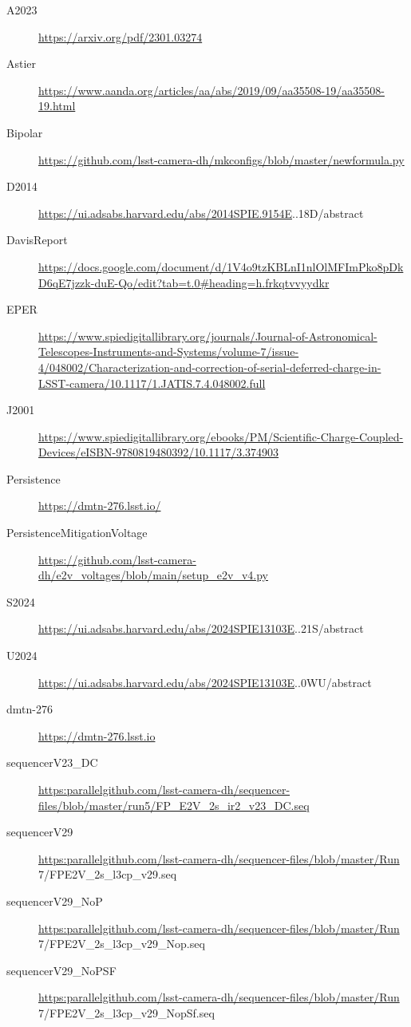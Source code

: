 \label{citations}
\begin{description}
\item[\label{A2023}{A2023}]
\url{https://arxiv.org/pdf/2301.03274}
\item[\label{Astier}{Astier}]
\url{https://www.aanda.org/articles/aa/abs/2019/09/aa35508-19/aa35508-19.html}
\item[\label{Bipolar}{Bipolar}]
\url{https://github.com/lsst-camera-dh/mkconfigs/blob/master/newformula.py}
\item[\label{D2014}{D2014}]
\url{https://ui.adsabs.harvard.edu/abs/2014SPIE.9154E}..18D/abstract
\item[\label{DavisReport}{DavisReport}]
\url{https://docs.google.com/document/d/1V4o9tzKBLnI1nlOlMFImPko8pDkD6qE7jzzk-duE-Qo/edit?tab=t.0\#heading=h.frkqtvvyydkr}
\item[\label{EPER}{EPER}]
\url{https://www.spiedigitallibrary.org/journals/Journal-of-Astronomical-Telescopes-Instruments-and-Systems/volume-7/issue-4/048002/Characterization-and-correction-of-serial-deferred-charge-in-LSST-camera/10.1117/1.JATIS.7.4.048002.full}
\item[\label{J2001}{J2001}]
\url{https://www.spiedigitallibrary.org/ebooks/PM/Scientific-Charge-Coupled-Devices/eISBN-9780819480392/10.1117/3.374903}
\item[\label{Persistence}{Persistence}]
\url{https://dmtn-276.lsst.io/}
\item[\label{PersistenceMitigationVoltage}{PersistenceMitigationVoltage}]
\url{https://github.com/lsst-camera-dh/e2v_voltages/blob/main/setup_e2v_v4.py}
\item[\label{S2024}{S2024}]
\url{https://ui.adsabs.harvard.edu/abs/2024SPIE13103E}..21S/abstract
\item[\label{U2024}{U2024}]
\url{https://ui.adsabs.harvard.edu/abs/2024SPIE13103E}..0WU/abstract
\item[\label{dmtn-276}{dmtn-276}]
\url{https://dmtn-276.lsst.io}
\item[\label{sequencerV23_DC}{sequencerV23\_DC}]
\url{https:parallelgithub.com/lsst-camera-dh/sequencer-files/blob/master/run5/FP_E2V_2s_ir2_v23_DC.seq}
\item[\label{sequencerV29}{sequencerV29}]
\url{https:parallelgithub.com/lsst-camera-dh/sequencer-files/blob/master/Run}
7/FP\label{e2v_2s_l3cp_v29.seq}{E2V\_2s\_l3cp\_v29.seq}
\item[\label{sequencerV29_NoP}{sequencerV29\_NoP}]
\url{https:parallelgithub.com/lsst-camera-dh/sequencer-files/blob/master/Run}
7/FP\label{e2v_2s_l3cp_v29_nop.seq}{E2V\_2s\_l3cp\_v29\_Nop.seq}
\item[\label{sequencerV29_NoPSF}{sequencerV29\_NoPSF}]
\url{https:parallelgithub.com/lsst-camera-dh/sequencer-files/blob/master/Run}
7/FP\label{e2v_2s_l3cp_v29_nopsf.seq}{E2V\_2s\_l3cp\_v29\_NopSf.seq}
\end{description}

